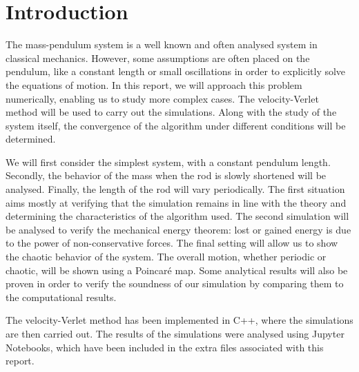 \section{Introduction}

The mass-pendulum system is a well known and often analysed system in classical mechanics. However, some assumptions are often placed on the pendulum, like a constant length or small oscillations in order to explicitly solve the equations of motion. In this report, we will approach this problem numerically, enabling us to study more complex cases. The velocity-Verlet method will be used to carry out the simulations. Along with the study of the system itself, the convergence of the algorithm under different conditions will be determined.

We will first consider the simplest system, with a constant pendulum length. Secondly, the behavior of the mass when the rod is slowly shortened will be analysed. Finally, the length of the rod will vary periodically. The first situation aims mostly at verifying that the simulation remains in line with the theory and determining the characteristics of the algorithm used. The second simulation will be analysed to verify the mechanical energy theorem: lost or gained energy is due to the power of non-conservative forces. The final setting will allow us to show the chaotic behavior of the system. The overall motion, whether periodic or chaotic, will be shown using a Poincaré map. Some analytical results will also be proven in order to verify the soundness of our simulation by comparing them to the computational results.

The velocity-Verlet method has been implemented in C++, where the simulations are then carried out. The results of the simulations were analysed using Jupyter Notebooks, which have been included in the extra files associated with this report.